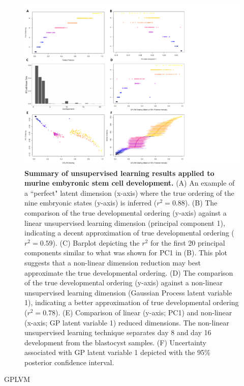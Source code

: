 \documentclass[english, 11pt]{article}\usepackage[]{graphicx}\usepackage[]{color}
\begin{document}
\begin{figure}[H]
\begin{center}
\includegraphics[scale=0.8]{images/Figure3.pdf}
\end{center}
\caption{\textbf{Summary of unsupervised learning results applied to murine embyronic stem cell development.} (A) An example of a ``perfect" latent dimension (x-axis) where the true ordering of the nine embryonic states (y-axis) is inferred ($r^2 = 0.88$). (B) The comparison of the true developmental ordering (y-axis) against a linear unsupervised learning dimension (principal component 1), indicating a decent approximation of true developmental ordering ($r^2 = 0.59$). (C) Barplot depicting the $r^2$ for the first 20 principal components similar to what was shown for PC1 in (B). This plot suggests that a non-linear dimension reduction may best approximate the true developmental ordering. (D) The comparison of the true developmental ordering (y-axis) against a non-linear unsupervised learning dimension (Gaussian Process latent variable 1), indicating a better approximation of true developmental ordering ($r^2 = 0.78$). (E) Comparison of linear (y-axis; PC1) and non-linear (x-axis; GP latent variable 1) reduced dimensions. The non-linear unsupervised learning technique separates day 8 and day 16 development from the blastocyst samples. (F) Uncertainty associated with GP latent variable 1 depicted with the 95\% posterior confidence interval. }
\end{figure}





GPLVM \cite{lawrence2004gaussian}
\end{document}
